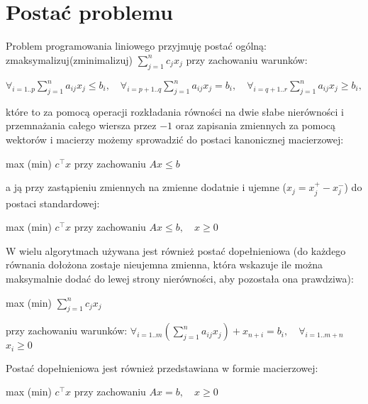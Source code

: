 \documentclass[licencjacka]{pracamgr}
\begin{document}
  \section{Postać problemu}
Problem programowania liniowego przyjmuję postać ogólną:\newline
zmaksymalizuj(zminimalizuj)
$
\sum\limits_{j=1}^{n}c_jx_j
$\newline
przy zachowaniu warunków:\newline
\centerline{
$
\forall_{i=1..p}\sum\limits_{j=1}^{n} a_{ij}x_j\le b_i,
\quad
\forall_{i=p+1..q}\sum\limits_{j=1}^{n} a_{ij}x_j= b_i,
\quad
\forall_{i=q+1..r}\sum\limits_{j=1}^{n} a_{ij}x_j\ge b_i,
$}\newline
które to za pomocą operacji rozkładania równości na dwie słabe nierówności i przemnażania całego wiersza przez $-1$ oraz zapisania zmiennych za pomocą wektorów i macierzy
możemy sprowadzić do postaci kanonicznej macierzowej:\newline
\centerline{max (min) $c^{\top}x$\quad\quad\quad
przy zachowaniu $Ax\le b$}\newline
a ją przy zastąpieniu zmiennych na zmienne dodatnie i ujemne ($x_j=x_j^+-x_j^-$) do postaci standardowej:\newline
\centerline{max (min) $c^{\top}x$\quad\quad\quad
przy zachowaniu $Ax\le b ,\quad x\ge0$}

W wielu algorytmach używana jest również postać dopełnieniowa
(do każdego równania dołożona zostaje nieujemna zmienna, która wskazuje ile można maksymalnie dodać do lewej strony nierówności, aby pozostała ona prawdziwa):\newline\newline
\centerline{max (min) $\sum\limits_{j=1}^{n}c_jx_j$}\newline
przy zachowaniu warunków:
$
\forall_{i=1..m}\left(\sum\limits_{j=1}^{n} a_{ij}x_j\right)+x_{n+i}= b_i,
\quad
\forall_{i=1..m+n}$ $x_i\ge0
$\newline

Postać dopełnieniowa jest również przedstawiana w formie macierzowej:\newline
\centerline{max (min) $c^{\top}x$\quad\quad\quad
przy zachowaniu $Ax=b,\quad x\ge0$}
%
\end{document}
